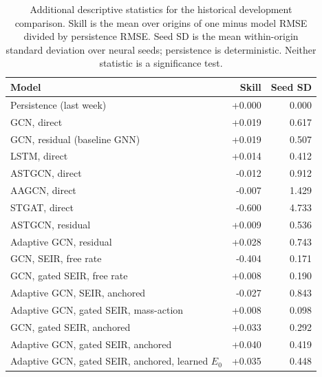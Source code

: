 \begin{table}[!ht]\centering
\caption{Additional descriptive statistics for the historical development comparison. Skill is the mean over origins of one minus model RMSE divided by persistence RMSE. Seed SD is the mean within-origin standard deviation over neural seeds; persistence is deterministic. Neither statistic is a significance test.}
\label{tab:seed}\small
\begin{tabular}{@{}p{1.8in}rr@{}}\toprule
Model & Skill & Seed SD \\\midrule
Persistence (last week) & +0.000 & 0.000 \\ %
GCN, direct & +0.019 & 0.617 \\ %
GCN, residual (baseline GNN) & +0.019 & 0.507 \\ %
LSTM, direct & +0.014 & 0.412 \\ %
ASTGCN, direct & -0.012 & 0.912 \\ %
AAGCN, direct & -0.007 & 1.429 \\ %
STGAT, direct & -0.600 & 4.733 \\ %
ASTGCN, residual & +0.009 & 0.536 \\ %
Adaptive GCN, residual & +0.028 & 0.743 \\ %
GCN, SEIR, free rate & -0.404 & 0.171 \\ %
GCN, gated SEIR, free rate & +0.008 & 0.190 \\ %
Adaptive GCN, SEIR, anchored & -0.027 & 0.843 \\ %
Adaptive GCN, gated SEIR, mass-action & +0.008 & 0.098 \\ %
GCN, gated SEIR, anchored & +0.033 & 0.292 \\ %
Adaptive GCN, gated SEIR, anchored & +0.040 & 0.419 \\ %
Adaptive GCN, gated SEIR, anchored, learned $E_0$ & +0.035 & 0.448 \\ %
\bottomrule\end{tabular}\end{table}
